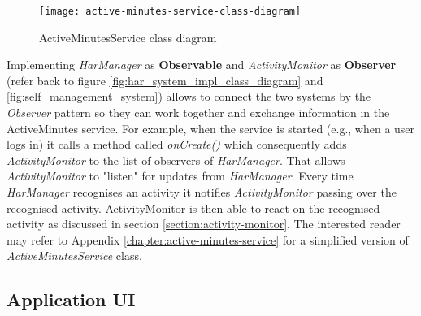     \begin{figure}[ht]
    \centering
    \texttt{[image: active-minutes-service-class-diagram]}
    \caption{ActiveMinutesService class diagram}
    \label{fig:active-minutes-service-class-diagram}
    \end{figure}
    
    Implementing \textit{HarManager} as \textbf{Observable} and \textit{ActivityMonitor} as \textbf{Observer}  (refer back to figure \ref{fig:har_system_impl_class_diagram} and \ref{fig:self_management_system}) allows to connect the two systems by the \textit{Observer} pattern so they can work together and exchange information in the ActiveMinutes service. For example, when the service is started (e.g., when a user logs in) it calls a method called \textit{onCreate()} which consequently adds \textit{ActivityMonitor} to the list of observers of \textit{HarManager}. That allows \textit{ActivityMonitor} to "listen" for updates from \textit{HarManager}. Every time \textit{HarManager} recognises an activity it notifies \textit{ActivityMonitor} passing over the recognised activity. ActivityMonitor is then able to react on the recognised activity as discussed in section \ref{section:activity-monitor}. The interested reader may refer to Appendix \ref{chapter:active-minutes-service} for a simplified version of \textit{ActiveMinutesService} class.

    
    \subsection{Application UI}  




    
    
    
    